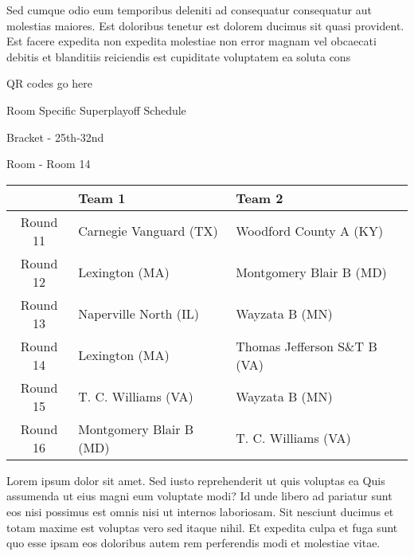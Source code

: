 \documentclass{article}%
\begin{document}
\newline%
    Sed cumque odio eum temporibus deleniti ad consequatur consequatur aut molestias maiores. Est doloribus tenetur est dolorem ducimus sit quasi provident. Est facere expedita non expedita molestiae non error magnam vel obcaecati debitis et blanditiis reiciendis est cupiditate voluptatem ea soluta cons%
\vspace*{140pt}%
\begin{center}%
\begin{Huge}%
QR codes go here%
\end{Huge}%
\end{center}%
\newpage%
\begin{center}%
\begin{Huge}%
Room Specific Superplayoff Schedule%
\end{Huge}%
\vspace*{8pt}%
\linebreak%
\begin{Large}%
Bracket {-} 25th{-}32nd%
\end{Large}%
\vspace*{8pt}%
\linebreak%
\vspace*{8pt}%
\begin{Large}%
Room {-} Room 14%
\end{Large}%
\end{center}%
%
\begin{tabularx}{\textwidth}{|c|Y|Y|}%
\hline%
&Team 1&Team 2\\%
\hline%
Round 11&Carnegie Vanguard (TX)&Woodford County A (KY)\\%
Round 12&Lexington (MA)&Montgomery Blair B (MD)\\%
Round 13&Naperville North (IL)&Wayzata B (MN)\\%
Round 14&Lexington (MA)&Thomas Jefferson S\&T B (VA)\\%
Round 15&T. C. Williams (VA)&Wayzata B (MN)\\%
Round 16&Montgomery Blair B (MD)&T. C. Williams (VA)\\%
\hline%
\end{tabularx}%
\vspace*{8pt}%
\newline%
    Lorem ipsum dolor sit amet. Sed iusto reprehenderit ut quis voluptas ea Quis assumenda ut eius magni eum voluptate modi? Id unde libero ad pariatur sunt eos nisi possimus est omnis nisi ut internos laboriosam. Sit nesciunt ducimus et totam maxime est voluptas vero sed itaque nihil. Et expedita culpa et fuga sunt quo esse ipsam eos doloribus autem rem perferendis modi et molestiae vitae.\newline%
\end{document}
